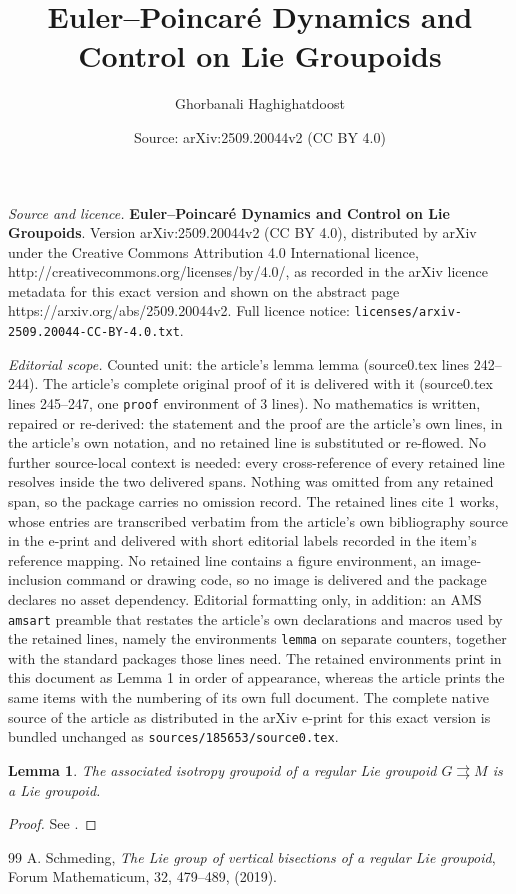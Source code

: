 \documentclass[10pt,a4paper]{amsart}
\title{\large{\bf Euler--Poincar\'e Dynamics and Control on Lie Groupoids}}
\author{Ghorbanali Haghighatdoost}
\date{Source: arXiv:2509.20044v2 (CC BY 4.0)}
\newtheorem{lemma}{Lemma}
\begin{document}
\maketitle

\noindent\emph{Source and licence.} \large{\bf Euler--Poincar\'e Dynamics and Control on Lie Groupoids}. Version arXiv:2509.20044v2 (CC BY 4.0), distributed by arXiv under the Creative Commons Attribution 4.0 International licence, http://creativecommons.org/licenses/by/4.0/, as recorded in the arXiv licence metadata for this exact version and shown on the abstract page https://arxiv.org/abs/2509.20044v2. Full licence notice: \texttt{licenses/arxiv-2509.20044-CC-BY-4.0.txt}.\par\smallskip

\noindent\textit{Editorial scope.} Counted unit: the article's lemma lemma (source0.tex lines 242--244). The article's complete original proof of it is delivered with it (source0.tex lines 245--247, one \texttt{proof} environment of 3 lines). No mathematics is written, repaired or re-derived: the statement and the proof are the article's own lines, in the article's own notation, and no retained line is substituted or re-flowed.  No further source-local context is needed: every cross-reference of every retained line resolves inside the two delivered spans.  Nothing was omitted from any retained span, so the package carries no omission record.  The retained lines cite 1 works, whose entries are transcribed verbatim from the article's own bibliography source in the e-print and delivered with short editorial labels recorded in the item's reference mapping.  No retained line contains a figure environment, an image-inclusion command or drawing code, so no image is delivered and the package declares no asset dependency.  Editorial formatting only, in addition: an AMS \texttt{amsart} preamble that restates the article's own declarations and macros used by the retained lines, namely the environments \texttt{lemma} on separate counters, together with the standard packages those lines need.  The retained environments print in this document as Lemma 1 in order of appearance, whereas the article prints the same items with the numbering of its own full document.  The complete native source of the article as distributed in the arXiv e-print for this exact version is bundled unchanged as \texttt{sources/185653/source0.tex}.
\begin{lemma}
The associated isotropy groupoid of a regular Lie groupoid $G \rightrightarrows M $ is a Lie groupoid.
\end{lemma}

\begin{proof}
See \cite{Schmeding}.
\end{proof}

\begin{thebibliography}{99}
 A. Schmeding, \textit{The Lie group of vertical bisections of a regular Lie groupoid}, Forum Mathematicum, 32, 479--489, (2019).
\end{thebibliography}
\end{document}
